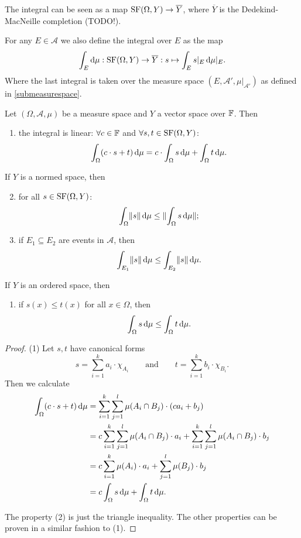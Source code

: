 The integral can be seen as a map $\operatorname{SF}(\Omega,Y)\to \overline{Y}$, where $\overline{Y}$ is the Dedekind-MacNeille completion (TODO!).

For any $E\in\mathcal{A}$ we also define the integral over $E$ as the map
\[ \int_E\operatorname{d \!}{\mu}: \operatorname{SF}(\Omega,Y) \to \overline{Y}: s\mapsto \int_E s|_E \operatorname{d \!}{\mu|_E}. \]
Where the last integral is taken over the measure space $(E,\mathcal{A}',\mu|_{\mathcal{A}'})$ as defined in \ref{submeasurespace}.

\begin{proposition} \label{integrationLinear} \label{integrationOrderPreserving}
Let $(\Omega, \mathcal{A}, \mu)$ be a measure space and $Y$ a vector space over $\mathbb{F}$. Then
\begin{enumerate}
\item the integral is linear: $\forall c\in \mathbb{F}$ and $\forall s,t\in\operatorname{SF}(\Omega, Y)$:
\[ \int_\Omega (c\cdot s + t)\operatorname{d \!}{\mu} = c\cdot \int_\Omega s\operatorname{d \!}{\mu} + \int_\Omega t\operatorname{d \!}{\mu}. \]
\end{enumerate}
If $Y$ is a normed space, then
\begin{enumerate} \setcounter{enumi}{1}
\item for all $s\in\operatorname{SF}(\Omega, Y)$:
\[ \int_\Omega \lVert s\rVert\operatorname{d \!}{\mu} \leq \lVert\int_\Omega s \operatorname{d \!}{\mu}\rVert; \]
\item if $E_1\subseteq E_2$ are events in $\mathcal{A}$, then
\[ \int_{E_1}\lVert s\rVert\operatorname{d \!}{\mu} \leq \int_{E_2}\lVert s\rVert\operatorname{d \!}{\mu}. \]
\end{enumerate} \setcounter{enumi}{3}
If $Y$ is an ordered space, then
\begin{enumerate}
\item if $s(x)\leq t(x)$ for all $x\in\Omega$, then
\[ \int_\Omega s\operatorname{d \!}{\mu} \leq \int_\Omega t\operatorname{d \!}{\mu}. \]
\end{enumerate}
\end{proposition}
\begin{proof}
(1) Let $s,t$ have canonical forms
\[ s = \sum_{i=1}^k a_i\cdot\chi_{A_i} \qquad\text{and}\qquad t = \sum_{i=1}^k b_i\cdot\chi_{B_i}. \]
Then we calculate
\begin{align*}
\int_\Omega (c\cdot s + t)\operatorname{d \!}{\mu} &= \sum_{i=1}^k\sum_{j=1}^l\mu(A_i\cap B_j)\cdot(c a_i + b_j) \\
&= c\sum_{i=1}^k\sum_{j=1}^l\mu(A_i\cap B_j)\cdot a_i +  \sum_{i=1}^k\sum_{j=1}^l\mu(A_i\cap B_j) \cdot b_j \\
&= c\sum_{i=1}^k\mu(A_i)\cdot a_i +  \sum_{j=1}^l\mu(B_j) \cdot b_j \\
&= c\int_\Omega s\operatorname{d \!}{\mu} + \int_\Omega t\operatorname{d \!}{\mu}.
\end{align*}

The property (2) is just the triangle inequality. The other properties can be proven in a similar fashion to (1).
\end{proof}

